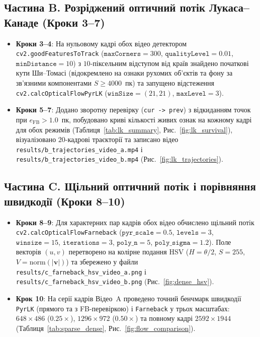 \documentclass[14pt, a4paper]{extarticle}
\begin{document}
\subsection{Частина B. Розріджений оптичний потік Лукаса--Канаде (Кроки 3--7)}
\begin{itemize}
    \item \textbf{Кроки 3--4}: На нульовому кадрі обох відео детектором \texttt{cv2.goodFeaturesToTrack} ($\texttt{maxCorners} = 300$, $\texttt{qualityLevel} = 0.01$, $\texttt{minDistance} = 10$) з $10$-піксельним відступом від країв знайдено початкові кути Ши--Томасі (відокремлено на ознаки рухомих об'єктів та фону за зв'язними компонентами $S \ge 4000$~пк) та запущено відстеження \texttt{cv2.calcOpticalFlowPyrLK} ($\texttt{winSize} = (21, 21)$, $\texttt{maxLevel} = 3$).
    \item \textbf{Кроки 5--7}: Додано зворотну перевірку (\texttt{cur -> prev}) з відкиданням точок при $e_{\text{FB}} > 1.0$~пк, побудовано криві кількості живих ознак на кожному кадрі для обох режимів (Таблиця~\ref{tab:lk_summary}, Рис.~\ref{fig:lk_survival}), візуалізовано $20$-кадрові траєкторії та записано відео \texttt{results/b\_trajectories\_video\_a.mp4} і \texttt{results/b\_trajectories\_video\_b.mp4} (Рис.~\ref{fig:lk_trajectories}).
\end{itemize}

\subsection{Частина C. Щільний оптичний потік і порівняння швидкодії (Кроки 8--10)}
\begin{itemize}
    \item \textbf{Кроки 8--9}: Для характерних пар кадрів обох відео обчислено щільний потік \texttt{cv2.calcOpticalFlowFarneback} ($\texttt{pyr\_scale}=0.5$, $\texttt{levels}=3$, $\texttt{winsize}=15$, $\texttt{iterations}=3$, $\texttt{poly\_n}=5$, $\texttt{poly\_sigma}=1.2$). Поле векторів $(u, v)$ перетворено на колірне подання HSV ($H = \theta/2$, $S = 255$, $V = \text{norm}(|\mathbf{v}|)$) та збережено у файли \texttt{results/c\_farneback\_hsv\_video\_a.png} і \texttt{results/c\_farneback\_hsv\_video\_b.png} (Рис.~\ref{fig:dense_hsv}).
    \item \textbf{Крок 10}: На серії кадрів Відео~A проведено точний бенчмарк швидкодії \texttt{PyrLK} (прямого та з FB-перевіркою) і \texttt{Farneback} у трьох масштабах: $648 \times 486$ ($0.25\times$), $1296 \times 972$ ($0.50\times$) та повному кадрі $2592 \times 1944$ (Таблиця~\ref{tab:sparse_dense}, Рис.~\ref{fig:flow_comparison}).
\end{itemize}
\end{document}

